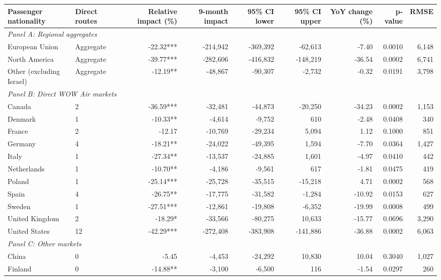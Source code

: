 \begin{table}
\centering
\scriptsize
\setlength{\tabcolsep}{3.5pt}
\begin{tabular}{llrrrrrrr}
\toprule
Passenger nationality & Direct routes & Relative impact (\%) & 9-month impact & 95\% CI lower & 95\% CI upper & YoY change (\%) & p-value & RMSE \\
\midrule
\multicolumn{9}{l}{\textit{Panel A: Regional aggregates}} \\
European Union & Aggregate & -22.32*** & -214,942 & -369,392 & -62,613 & -7.40 & 0.0010 & 6,148 \\
North America & Aggregate & -39.77*** & -282,606 & -416,832 & -148,219 & -36.54 & 0.0002 & 6,741 \\
Other (excluding Israel) & Aggregate & -12.19** & -48,867 & -90,307 & -2,732 & -0.32 & 0.0191 & 3,798 \\
\midrule
\multicolumn{9}{l}{\textit{Panel B: Direct WOW Air markets}} \\
Canada & 2 & -36.59*** & -32,481 & -44,873 & -20,250 & -34.23 & 0.0002 & 1,153 \\
Denmark & 1 & -10.33** & -4,614 & -9,752 & 610 & -2.48 & 0.0408 & 340 \\
France & 2 & -12.17 & -10,769 & -29,234 & 5,094 & 1.12 & 0.1000 & 851 \\
Germany & 4 & -18.21** & -24,022 & -49,395 & 1,594 & -7.70 & 0.0364 & 1,427 \\
Italy & 1 & -27.34** & -13,537 & -24,885 & 1,601 & -4.97 & 0.0410 & 442 \\
Netherlands & 1 & -10.70** & -4,186 & -9,561 & 617 & -1.81 & 0.0475 & 419 \\
Poland & 1 & -25.14*** & -25,728 & -35,515 & -15,218 & 4.71 & 0.0002 & 568 \\
Spain & 4 & -26.75** & -17,775 & -31,582 & -1,284 & -10.92 & 0.0153 & 627 \\
Sweden & 1 & -27.51*** & -12,861 & -19,808 & -6,352 & -19.99 & 0.0008 & 499 \\
United Kingdom & 2 & -18.29* & -33,566 & -80,275 & 10,633 & -15.77 & 0.0696 & 3,290 \\
United States & 12 & -42.29*** & -272,408 & -383,908 & -141,886 & -36.88 & 0.0002 & 6,063 \\
\midrule
\multicolumn{9}{l}{\textit{Panel C: Other markets}} \\
China & 0 & -5.45 & -4,453 & -24,292 & 10,830 & 10.04 & 0.3040 & 1,027 \\
Finland & 0 & -14.88** & -3,100 & -6,500 & 116 & -1.54 & 0.0297 & 260 \\

\end{tabular}
\end{table}
